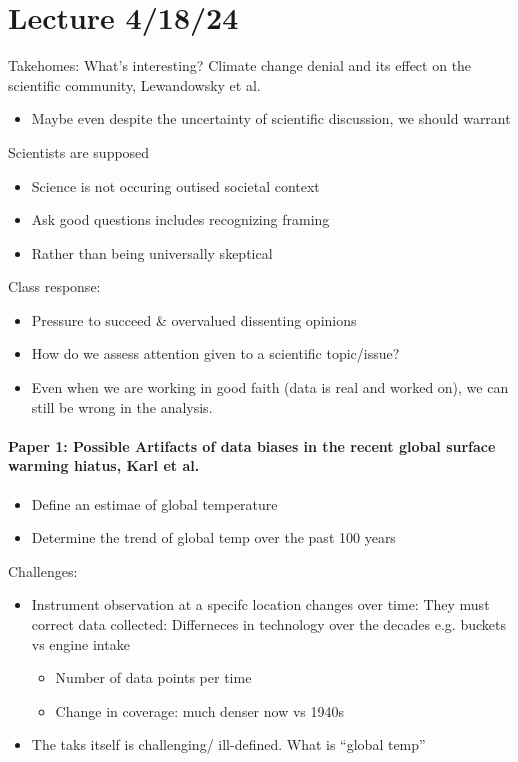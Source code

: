 \documentclass[../main.tex]{subfiles}
\begin{document}
\section*{Lecture 4/18/24}
Takehomes: What's interesting? Climate change denial 
and its effect on the scientific community, Lewandowsky et al.
\begin{itemize}
    \item Maybe even despite the uncertainty of scientific discussion, we should warrant
\end{itemize}
Scientists are supposed 

\begin{itemize}
    \item Science is not occuring outised societal context
    \item Ask good questions includes recognizing framing
    \item Rather than being universally skeptical
\end{itemize}
Class response:
\begin{itemize}
    \item Pressure to succeed \& overvalued dissenting opinions 
    \item How do we assess attention given to a scientific topic/issue?
    \item Even when we are working in good faith (data is real and worked on), we can still be
    wrong in the analysis.
\end{itemize}

\paragraph*{Paper 1: Possible Artifacts of data biases in the recent global surface warming hiatus, Karl et al.} 
\begin{itemize}
    \item Define an estimae of global temperature
    \item Determine the trend of global temp over the past 100 years
\end{itemize}
Challenges:
\begin{itemize}
    \item Instrument observation at a specifc location changes over time: They must correct data 
    collected: Differneces in technology over the decades e.g. buckets vs engine intake
    \begin{itemize}
        \item Number of data points per time
        \item Change in coverage: much denser now vs 1940s
    \end{itemize}
    \item The taks itself is challenging/ ill-defined. What is ``global temp'' 
\end{itemize}
\end{document}
